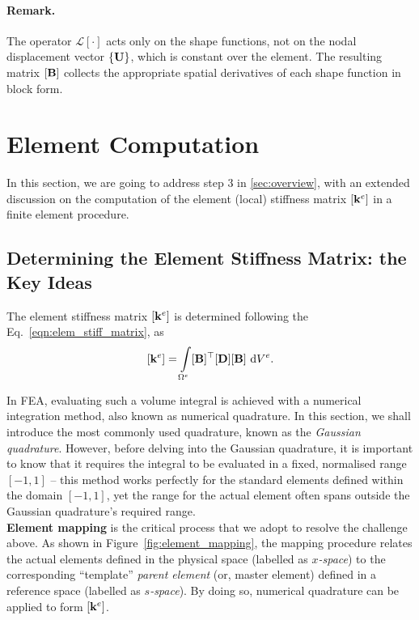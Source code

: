 \documentclass[12pt, a4paper]{article}
\numberwithin{equation}{section}
\begin{document}
\paragraph{Remark.}  
The operator $\mathcal{L}[\cdot]$ acts only on the shape functions, not on the nodal displacement vector $\{\mathbf{U}\}$, which is constant over the element. The resulting matrix $[\mathbf{B}]$ collects the appropriate spatial derivatives of each shape function in block form.

\newpage
\section{Element Computation}
\label{sec:element_computation}
In this section, we are going to address step 3 in \ref{sec:overview}, with an extended discussion on the computation of the element (local) stiffness matrix $[\mathbf{k}^e]$ in a finite element procedure.

\subsection{Determining the Element Stiffness Matrix: the Key Ideas}
The element stiffness matrix $[\mathbf{k}^e]$ is determined following the Eq.~\eqref{eqn:elem_stiff_matrix}, as
\[
    [\mathbf{k}^e] = \int\limits_{\Omega^{e}} [\mathbf{B}]^\top [\mathbf{D}] [\mathbf{B}] \ \mathrm{d} V^e.
\]

In FEA, evaluating such a volume integral is achieved with a numerical integration method, also known as numerical quadrature. In this section, we shall introduce the most commonly used quadrature, known as the \textit{Gaussian quadrature}. However, before delving into the Gaussian quadrature, it is important to know that it requires the integral to be evaluated in a fixed, normalised range $[-1, 1]$ -- this method works perfectly for the standard elements defined within the domain $[-1, 1]$, yet the range for the actual element often spans outside the Gaussian quadrature's required range. \\

\textbf{Element mapping} is the critical process that we adopt to resolve the challenge above. As shown in Figure~\ref{fig:element_mapping}, the mapping procedure relates the actual elements defined in the physical space (labelled as \textit{$x$-space}) to the corresponding ``template'' \textit{parent element} (or, master element) defined in a reference space (labelled as \textit{$s$-space}). By doing so, numerical quadrature can be applied to form $[\mathbf{k}^e]$. 
\end{document}
